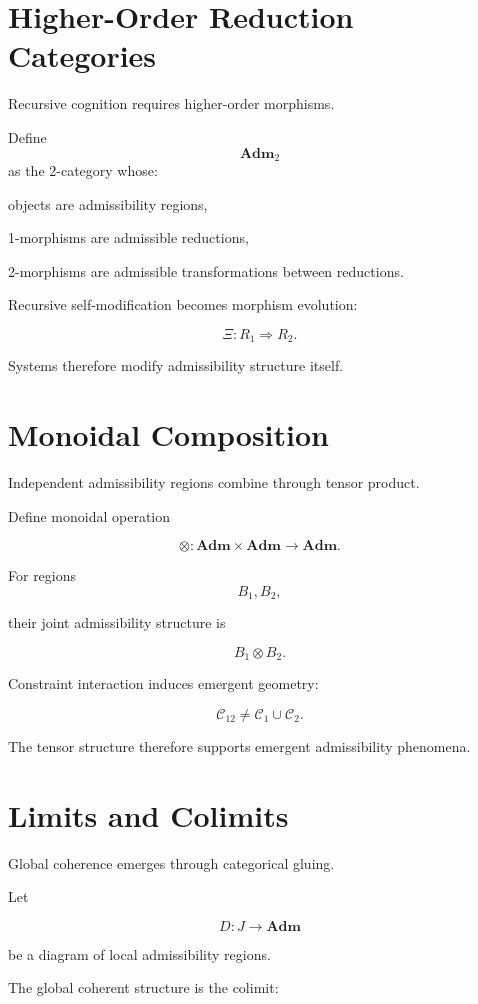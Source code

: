 \documentclass[12pt,openany]{book}
\theoremstyle{plain}
\theoremstyle{definition}
\theoremstyle{remark}
\begin{document}
\section{Higher-Order Reduction Categories}

Recursive cognition requires higher-order morphisms.

Define
\[
\mathbf{Adm}_2
\]
as the 2-category whose:

objects are admissibility regions,

1-morphisms are admissible reductions,

2-morphisms are admissible transformations between reductions.

Recursive self-modification becomes morphism evolution:

\[
\Xi :
R_1 \Rightarrow R_2.
\]

Systems therefore modify admissibility structure itself.

\section{Monoidal Composition}

Independent admissibility regions combine through tensor product.

Define monoidal operation

\[
\otimes :
\mathbf{Adm}\times\mathbf{Adm}
\to
\mathbf{Adm}.
\]

For regions
\[
B_1,B_2,
\]

their joint admissibility structure is

\[
B_1\otimes B_2.
\]

Constraint interaction induces emergent geometry:

\[
\mathcal{C}_{12}
\neq
\mathcal{C}_1\cup\mathcal{C}_2.
\]

The tensor structure therefore supports emergent admissibility
phenomena.

\section{Limits and Colimits}

Global coherence emerges through categorical gluing.

Let

\[
D :
J\to\mathbf{Adm}
\]

be a diagram of local admissibility regions.

The global coherent structure is the colimit:
\end{document}
